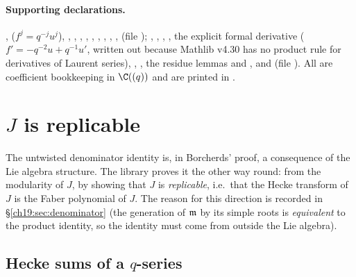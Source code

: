\paragraph{Supporting declarations.}  , 
($f^j=q^{-j}u^j$), , , ,
, , , ,
, , 
(file ); , ,
, , the explicit formal derivative
 ($f'=-q^{-2}u+q^{-1}u'$, written out because Mathlib v4.30 has no product rule for derivatives
of Laurent series), , , the residue
lemmas  and , and
 (file ).  All are coefficient
bookkeeping in $\C((q))$ and are printed in .

\section{\texorpdfstring{$J$}{J} is replicable}\label{ch19:sec:Jrep}

The untwisted denominator identity is, in Borcherds' proof, a consequence of the Lie algebra structure.  The library
proves it the other way round: from the modularity of $J$, by showing that $J$ is \emph{replicable}, i.e.\ that the
Hecke transform of $J$ is the Faber polynomial of $J$.  The reason for this direction is recorded in
\S\ref{ch19:sec:denominator} (the generation of $\mathfrak{m}$ by its simple roots is \emph{equivalent} to the product
identity, so the identity must come from outside the Lie algebra).

\subsection{Hecke sums of a \texorpdfstring{$q$}{q}-series}

